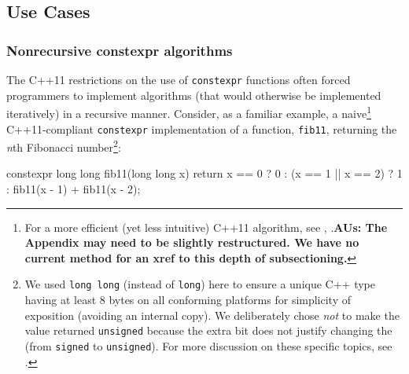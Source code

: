\subsection[Use Cases]{Use Cases}\label{use-cases-relaxedconstexpr}

\subsubsection[Nonrecursive \lstinline!constexpr! algorithms]{Nonrecursive {\SubsubsecCode constexpr} algorithms}\label{non-recursive-constexpr-algorithms}

The C++11 restrictions on the use of \lstinline!constexpr! functions often
forced programmers to implement algorithms (that would otherwise be
implemented iteratively) in a recursive manner. Consider, as a familiar
example, a naive{\cprotect\footnote{For a more efficient (yet less
intuitive) C++11 algorithm, see , .\textbf{AUs: The Appendix may need to be slightly restructured. We have no current method for an xref to this depth of subsectioning. }}}
C++11-compliant \lstinline!constexpr! implementation of a function,
\lstinline!fib11!, returning the \emph{n}th Fibonacci number\footnote{We used \lstinline!long!~\lstinline!long! (instead of \lstinline!long!)
here to ensure a unique C++ type having at least 8 bytes on all
conforming platforms for simplicity of exposition (avoiding an internal
copy). We deliberately chose \emph{not} to make the value returned
\lstinline!unsigned! because the extra bit does not justify changing the
 (from \lstinline!signed! to \lstinline!unsigned!). For more
discussion on these specific topics, see .}:
  
\begin{emcppslisting}
constexpr long long fib11(long long x)
{
    return
        x == 0 ? 0
               : (x == 1 || x == 2) ? 1
                                    : fib11(x - 1) + fib11(x - 2);
}
\end{emcppslisting}
    
